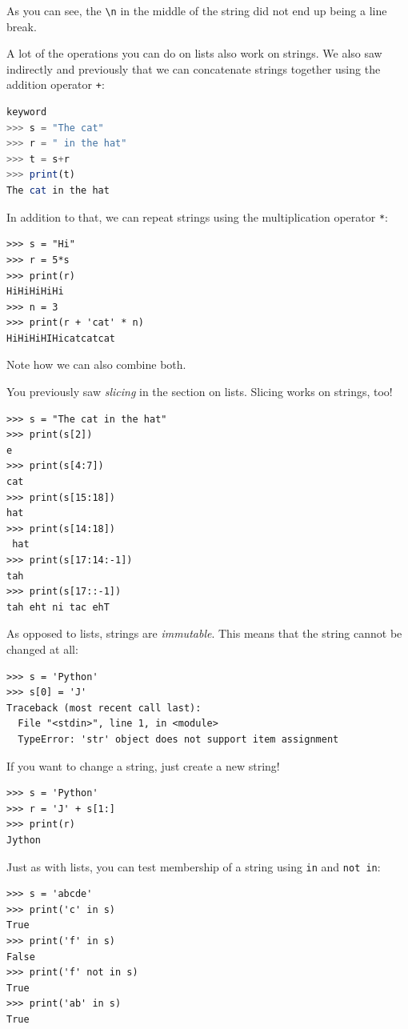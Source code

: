 \documentclass[11pt]{cselabheader}
\begin{document}
As you can see, the \lstinline!\n! in the middle of the string did not end up
being a line break.

A lot of the operations you can do on lists also work on strings. We also saw
indirectly and previously that we can concatenate strings together using the
addition operator \lstinline!+!:
\begin{lstlisting}[style=ipython,language=Octave] % octave doesn't have in
keyword
>>> s = "The cat"
>>> r = " in the hat"
>>> t = s+r
>>> print(t)
The cat in the hat
\end{lstlisting}

In addition to that, we can repeat strings using the multiplication operator
\lstinline!*!:
\begin{lstlisting}[style=ipython]
>>> s = "Hi"
>>> r = 5*s
>>> print(r)
HiHiHiHiHi
>>> n = 3
>>> print(r + 'cat' * n)
HiHiHiHIHicatcatcat
\end{lstlisting}
Note how we can also combine both.

You previously saw \emph{slicing} in the section on lists. Slicing works on strings, too!
\begin{lstlisting}[style=ipython]
>>> s = "The cat in the hat"
>>> print(s[2])
e
>>> print(s[4:7])
cat
>>> print(s[15:18])
hat
>>> print(s[14:18])
 hat
>>> print(s[17:14:-1])
tah
>>> print(s[17::-1])
tah eht ni tac ehT
\end{lstlisting}

As opposed to lists, strings are \emph{immutable}. This means that the string
cannot be changed at all:
\begin{lstlisting}[style=ipython]
>>> s = 'Python'
>>> s[0] = 'J'
Traceback (most recent call last):
  File "<stdin>", line 1, in <module>
  TypeError: 'str' object does not support item assignment
\end{lstlisting}

If you want to change a string, just create a new string!
\begin{lstlisting}[style=ipython]
>>> s = 'Python'
>>> r = 'J' + s[1:]
>>> print(r)
Jython
\end{lstlisting}

Just as with lists, you can test membership of a string using \lstinline!in! and
\lstinline!not in!:
\begin{lstlisting}[style=ipython]
>>> s = 'abcde'
>>> print('c' in s)
True
>>> print('f' in s)
False
>>> print('f' not in s)
True
>>> print('ab' in s)
True
\end{lstlisting}
\end{document}
